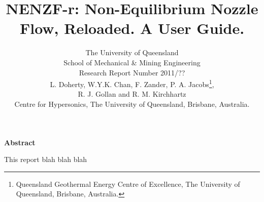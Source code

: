 \documentclass[12pt,a4paper]{article}
\title{
    NENZF-r: Non-Equilibrium Nozzle\\
    Flow, Reloaded. A User Guide.
}
\author{
    The University of Queensland \\
    School of Mechanical \& Mining Engineering \\
    Research Report Number 2011/?? 
    \vspace{0.5cm} \\
    L. Doherty,
    W.Y.K. Chan,
    F. Zander, 
    P. A. Jacobs\thanks{Queensland Geothermal Energy Centre of 
     Excellence, The University of Queensland, Brisbane, Australia.},\\
    R. J. Gollan and 
    R. M. Kirchhartz\\
    {Centre for Hypersonics, The University of 
     Queensland, Brisbane, Australia.}
\\
}
\begin{document}
\maketitle

\centerline{\textbf{Abstract}}
\medskip
This report blah blah blah
\newpage
\tableofcontents










\newpage

%


\newpage
\appendix

%
\end{document}
